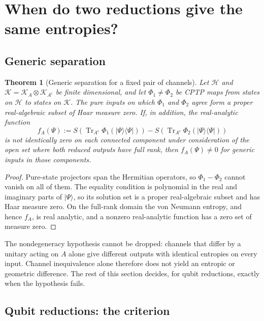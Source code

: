 \documentclass[12pt,a4paper]{article}
\newtheorem{theorem}{Theorem}[section]
\begin{document}
\section{When do two reductions give the same entropies?}
\label{sec:entropy}

\subsection{Generic separation}

\begin{theorem}[Generic separation for a fixed pair of channels]
\label{thm:inequiv}
Let $\mathcal H$ and $\mathcal K=\mathcal K_A\otimes\mathcal K_{A^c}$ be finite dimensional, and let $\Phi_1\ne\Phi_2$ be CPTP maps from states on $\mathcal H$ to states on $\mathcal K$. The pure inputs on which $\Phi_1$ and $\Phi_2$ agree form a proper real-algebraic subset of Haar measure zero. If, in addition, the real-analytic function
\[
f_A(\Psi):=
S\!\left(\operatorname{Tr}_{A^c}\Phi_1(|\Psi\rangle\!\langle\Psi|)\right)
-S\!\left(\operatorname{Tr}_{A^c}\Phi_2(|\Psi\rangle\!\langle\Psi|)\right)
\]
is not identically zero on each connected component under consideration of the open set where both reduced outputs have full rank, then $f_A(\Psi)\ne0$ for generic inputs in those components.
\end{theorem}

\begin{proof}
Pure-state projectors span the Hermitian operators, so $\Phi_1-\Phi_2$ cannot vanish on all of them. The equality condition is polynomial in the real and imaginary parts of $|\Psi\rangle$, so its solution set is a proper real-algebraic subset and has Haar measure zero. On the full-rank domain the von Neumann entropy, and hence $f_A$, is real analytic, and a nonzero real-analytic function has a zero set of measure zero.
\end{proof}

The nondegeneracy hypothesis cannot be dropped: channels that differ by a unitary acting on $A$ alone give different outputs with identical entropies on every input. Channel inequivalence alone therefore does not yield an entropic or geometric difference. The rest of this section decides, for qubit reductions, exactly when the hypothesis fails.

\subsection{Qubit reductions: the criterion}
\end{document}
